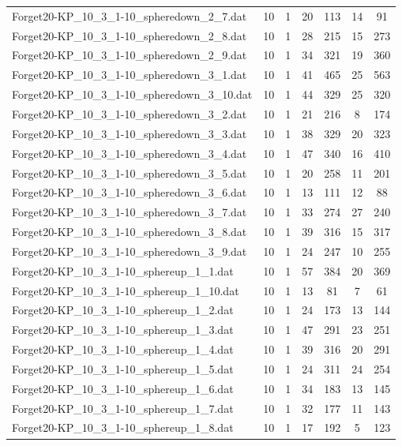 \begin{table}[!ht]
\begin{tabular}{lcccccc}
Forget20-KP\_10\_3\_1-10\_spheredown\_2\_7.dat & 10 & 1 & 20 & 113 & 14 & 91 \\
Forget20-KP\_10\_3\_1-10\_spheredown\_2\_8.dat & 10 & 1 & 28 & 215 & 15 & 273 \\
Forget20-KP\_10\_3\_1-10\_spheredown\_2\_9.dat & 10 & 1 & 34 & 321 & 19 & 360 \\
Forget20-KP\_10\_3\_1-10\_spheredown\_3\_1.dat & 10 & 1 & 41 & 465 & 25 & 563 \\
Forget20-KP\_10\_3\_1-10\_spheredown\_3\_10.dat & 10 & 1 & 44 & 329 & 25 & 320 \\
Forget20-KP\_10\_3\_1-10\_spheredown\_3\_2.dat & 10 & 1 & 21 & 216 & 8 & 174 \\
Forget20-KP\_10\_3\_1-10\_spheredown\_3\_3.dat & 10 & 1 & 38 & 329 & 20 & 323 \\
Forget20-KP\_10\_3\_1-10\_spheredown\_3\_4.dat & 10 & 1 & 47 & 340 & 16 & 410 \\
Forget20-KP\_10\_3\_1-10\_spheredown\_3\_5.dat & 10 & 1 & 20 & 258 & 11 & 201 \\
Forget20-KP\_10\_3\_1-10\_spheredown\_3\_6.dat & 10 & 1 & 13 & 111 & 12 & 88 \\
Forget20-KP\_10\_3\_1-10\_spheredown\_3\_7.dat & 10 & 1 & 33 & 274 & 27 & 240 \\
Forget20-KP\_10\_3\_1-10\_spheredown\_3\_8.dat & 10 & 1 & 39 & 316 & 15 & 317 \\
Forget20-KP\_10\_3\_1-10\_spheredown\_3\_9.dat & 10 & 1 & 24 & 247 & 10 & 255 \\
Forget20-KP\_10\_3\_1-10\_sphereup\_1\_1.dat & 10 & 1 & 57 & 384 & 20 & 369 \\
Forget20-KP\_10\_3\_1-10\_sphereup\_1\_10.dat & 10 & 1 & 13 & 81 & 7 & 61 \\
Forget20-KP\_10\_3\_1-10\_sphereup\_1\_2.dat & 10 & 1 & 24 & 173 & 13 & 144 \\
Forget20-KP\_10\_3\_1-10\_sphereup\_1\_3.dat & 10 & 1 & 47 & 291 & 23 & 251 \\
Forget20-KP\_10\_3\_1-10\_sphereup\_1\_4.dat & 10 & 1 & 39 & 316 & 20 & 291 \\
Forget20-KP\_10\_3\_1-10\_sphereup\_1\_5.dat & 10 & 1 & 24 & 311 & 24 & 254 \\
Forget20-KP\_10\_3\_1-10\_sphereup\_1\_6.dat & 10 & 1 & 34 & 183 & 13 & 145 \\
Forget20-KP\_10\_3\_1-10\_sphereup\_1\_7.dat & 10 & 1 & 32 & 177 & 11 & 143 \\
Forget20-KP\_10\_3\_1-10\_sphereup\_1\_8.dat & 10 & 1 & 17 & 192 & 5 & 123 \\

\end{tabular}
\end{table}
